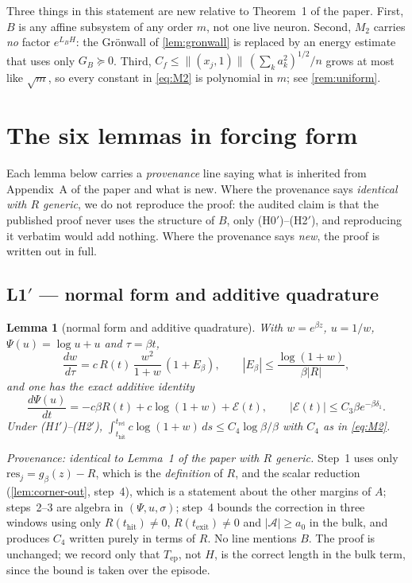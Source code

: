 \documentclass[11pt]{article}
\newtheorem{lemma}{Lemma}
\theoremstyle{definition}
\theoremstyle{remark}
\newcommand{\thit}{t_{\mathrm{hit}}}
\newcommand{\texit}{t_{\mathrm{exit}}}
\newcommand{\trel}{t_{\mathrm{rel}}}
\newcommand{\Ar}{\mathcal{A}}
\newcommand{\Tep}{T_{\mathrm{ep}}}
\newcommand{\res}{\mathrm{res}}
\begin{document}
Three things in this statement are new relative to Theorem~1 of the paper. First,
$B$ is any affine subsystem of any order $m$, not one live neuron. Second,
$M_2$ carries \emph{no} factor $e^{L_BH}$: the Gr\"onwall of
\cref{lem:gronwall} is replaced by an energy estimate that uses only
$G_B\succeq0$. Third, $C_f\le\|(x_j,1)\|\,(\sum_ka_k^2)^{1/2}/n$ grows at most
like $\sqrt m$, so every constant in \eqref{eq:M2} is polynomial in $m$; see
\cref{rem:uniform}.

\section{The six lemmas in forcing form}\label{sec:lemmas}

Each lemma below carries a \emph{provenance} line saying what is inherited from
Appendix~A of the paper and what is new. Where the provenance says
\emph{identical with $R$ generic}, we do not reproduce the proof: the audited
claim is that the published proof never uses the structure of $B$, only
(H0$'$)--(H2$'$), and reproducing it verbatim would add nothing. Where the
provenance says \emph{new}, the proof is written out in full.

\subsection*{L1$'$ --- normal form and additive quadrature}

\begin{lemma}[normal form and additive quadrature]\label{lem:gauge}
With $w=e^{\beta z}$, $u=1/w$, $\Psi(u)=\log u+u$ and $\tau=\beta t$,
\begin{equation}\label{eq:normalform}
\frac{dw}{d\tau}=c\,R(t)\,\frac{w^2}{1+w}\,(1+E_\beta),
\qquad |E_\beta|\le\frac{\log(1+w)}{\beta|R|},
\end{equation}
and one has the exact additive identity
\begin{equation}\label{eq:quadrature}
\frac{d\Psi(u)}{dt}=-c\beta R(t)+c\log(1+w)+\mathcal E(t),
\qquad
|\mathcal E(t)|\le C_3\beta e^{-\beta\delta_1}.
\end{equation}
Under \textup{(H1$'$)--(H2$'$)},
$\int_{\thit}^{\trel}c\log(1+w)\,ds\le C_4\log\beta/\beta$ with $C_4$ as in
\eqref{eq:M2}.
\end{lemma}

\noindent\emph{Provenance: identical to Lemma~1 of the paper with $R$ generic.}
Step~1 uses only $\res_j=g_\beta(z)-R$, which is the \emph{definition} of $R$,
and the scalar reduction (\cref{lem:corner-out}, step~4), which is a statement
about the other margins of $A$; steps~2--3 are algebra in $(\Psi,u,\sigma)$;
step~4 bounds the correction in three windows using only $R(\thit)\ne0$,
$R(\texit)\ne0$ and $|\Ar|\ge a_0$ in the bulk, and produces $C_4$ written purely
in terms of $R$. No line mentions $B$. The proof is unchanged; we record only
that $\Tep$, not $H$, is the correct length in the bulk term, since the bound is
taken over the episode.
\end{document}
